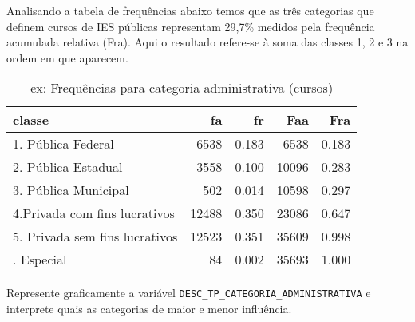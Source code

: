 \documentclass[12pt,]{style/krantz}
\makeatletter
\newenvironment{Shaded}{\begin{snugshade}}{\end{snugshade}}
\newcommand{\KeywordTok}[1]{\textcolor[rgb]{0.13,0.29,0.53}{\textbf{#1}}}
\newcommand{\DataTypeTok}[1]{\textcolor[rgb]{0.13,0.29,0.53}{#1}}
\newcommand{\DecValTok}[1]{\textcolor[rgb]{0.00,0.00,0.81}{#1}}
\newcommand{\StringTok}[1]{\textcolor[rgb]{0.31,0.60,0.02}{#1}}
\newcommand{\OtherTok}[1]{\textcolor[rgb]{0.56,0.35,0.01}{#1}}
\newcommand{\OperatorTok}[1]{\textcolor[rgb]{0.81,0.36,0.00}{\textbf{#1}}}
\newcommand{\NormalTok}[1]{#1}
\newenvironment{kframe}{%
\medskip{}
\setlength{\fboxsep}{.8em}
 \def\at@end@of@kframe{}%
 \ifinner\ifhmode%
  \def\at@end@of@kframe{\end{minipage}}%
  \begin{minipage}{\columnwidth}%
 \fi\fi%
 \def\FrameCommand##1{\hskip\@totalleftmargin \hskip-\fboxsep
 \colorbox{shadecolor}{##1}\hskip-\fboxsep
     \hskip-\linewidth \hskip-\@totalleftmargin \hskip\columnwidth}%
 \MakeFramed {\advance\hsize-\width
   \@totalleftmargin\z@ \linewidth\hsize
   \@setminipage}}%
 {\par\unskip\endMakeFramed%
 \at@end@of@kframe}
\renewenvironment{Shaded}{\begin{kframe}}{\end{kframe}}
\theoremstyle{definition}
\theoremstyle{definition}
\theoremstyle{definition}
\theoremstyle{remark}
\let\BeginKnitrBlock\begin \let\EndKnitrBlock\end
\makeatother
\begin{document}
\BeginKnitrBlock{solution}
\iffalse{} {Solução. } \fi{}Analisando a tabela de frequências abaixo
temos que as três categorias que definem cursos de IES públicas
representam 29,7\% medidos pela frequência acumulada relativa (Fra).
Aqui o resultado refere-se à soma das classes 1, 2 e 3 na ordem em que
aparecem.
\EndKnitrBlock{solution}

\begin{Shaded}
\end{Shaded}

\begin{table}[!h]

\caption{\label{tab:unnamed-chunk-39}ex: Frequências para categoria administrativa (cursos)}
\centering
\begin{tabular}{lrrrr}
\toprule
classe & fa & fr & Faa & Fra\\
\midrule
1. Pública Federal & 6538 & 0.183 & 6538 & 0.183\\
2. Pública Estadual & 3558 & 0.100 & 10096 & 0.283\\
3. Pública Municipal & 502 & 0.014 & 10598 & 0.297\\
4.Privada com fins lucrativos & 12488 & 0.350 & 23086 & 0.647\\
5. Privada sem fins lucrativos & 12523 & 0.351 & 35609 & 0.998\\
\addlinespace
7. Especial & 84 & 0.002 & 35693 & 1.000\\
\bottomrule
\end{tabular}
\end{table}

\BeginKnitrBlock{exercise}
\protect\hypertarget{exr:unnamed-chunk-40}{}{\label{exr:unnamed-chunk-40}
}Represente graficamente a variável
\texttt{DESC\_TP\_CATEGORIA\_ADMINISTRATIVA} e interprete quais as
categorias de maior e menor influência.
\EndKnitrBlock{exercise}
\end{document}
